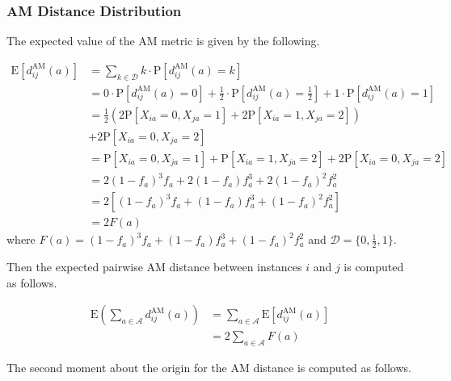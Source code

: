 \documentclass[10pt,letterpaper]{article}\usepackage[]{graphicx}\usepackage[]{color}
\begin{document}
\subsubsection{AM Distance Distribution}

The expected value of the AM metric is given by the following.

\begin{equation}\label{eq:mean_diff_AM}
\begin{aligned}
\text{E}\left[d^\text{AM}_{ij}(a)\right] &= \sum_{k \in \mathcal{D}} k \cdot \text{P}\left[d^\text{AM}_{ij}(a) = k\right] \\
&= 0 \cdot \text{P}\left[d^\text{AM}_{ij}(a) = 0\right] + \frac{1}{2} \cdot \text{P}\left[d^\text{AM}_{ij}(a) = \frac{1}{2}\right] + 1 \cdot \text{P}\left[d^\text{AM}_{ij}(a) = 1\right] \\
&= \frac{1}{2}\left(2 \text{P}\left[X_{ia} = 0, X_{ja} = 1\right] + 2 \text{P}\left[X_{ia} = 1, X_{ja} = 2\right]\right) \\
&+ 2 \text{P}\left[X_{ia} = 0, X_{ja} = 2\right] \\
&= \text{P}\left[X_{ia} = 0, X_{ja} = 1\right] + \text{P}\left[X_{ia} = 1, X_{ja} = 2\right] + 2 \text{P}\left[X_{ia} = 0, X_{ja} = 2\right] \\
&= 2(1 - f_a)^3f_a + 2(1 - f_a)f^3_a + 2(1 - f_a)^2 f^2_a \\
&= 2\left[(1 - f_a)^3f_a + (1 - f_a)f^3_a + (1 - f_a)^2 f^2_a\right] \\
&= 2F(a)
\end{aligned}
\end{equation}
where $F(a) = (1 - f_a)^3f_a + (1 - f_a)f^3_a + (1 - f_a)^2 f^2_a$ and $\mathcal{D} = \{0,\frac{1}{2},1\}$.

Then the expected pairwise AM distance between instances $i$ and $j$ is computed as follows.

\begin{equation}\label{eq:mu_DDistr_AM}
\begin{aligned}
\text{E}\left(\sum_{a \in \mathcal{A}} d^\text{AM}_{ij}(a)\right) &= \sum_{a \in \mathcal{A}} \text{E}\left[d^\text{AM}_{ij}(a)\right] \\
&= 2 \sum_{a \in \mathcal{A}} F(a)
\end{aligned}
\end{equation}

The second moment about the origin for the AM distance is computed as follows.
\end{document}
